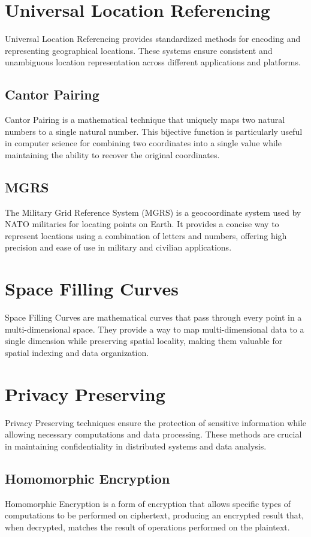 \documentclass[12pt,a4paper,twoside]{book}
\begin{document}
\section{Universal Location Referencing}
Universal Location Referencing provides standardized methods for encoding and representing geographical locations. These systems ensure consistent and unambiguous location representation across different applications and platforms.

\subsection{Cantor Pairing}
Cantor Pairing is a mathematical technique that uniquely maps two natural numbers to a single natural number. This bijective function is particularly useful in computer science for combining two coordinates into a single value while maintaining the ability to recover the original coordinates.

\subsection{MGRS}
The Military Grid Reference System (MGRS) is a geocoordinate system used by NATO militaries for locating points on Earth. It provides a concise way to represent locations using a combination of letters and numbers, offering high precision and ease of use in military and civilian applications.

\section{Space Filling Curves}
Space Filling Curves are mathematical curves that pass through every point in a multi-dimensional space. They provide a way to map multi-dimensional data to a single dimension while preserving spatial locality, making them valuable for spatial indexing and data organization.

\section{Privacy Preserving}
Privacy Preserving techniques ensure the protection of sensitive information while allowing necessary computations and data processing. These methods are crucial in maintaining confidentiality in distributed systems and data analysis.

\subsection{Homomorphic Encryption}
Homomorphic Encryption is a form of encryption that allows specific types of computations to be performed on ciphertext, producing an encrypted result that, when decrypted, matches the result of operations performed on the plaintext.
\end{document}
